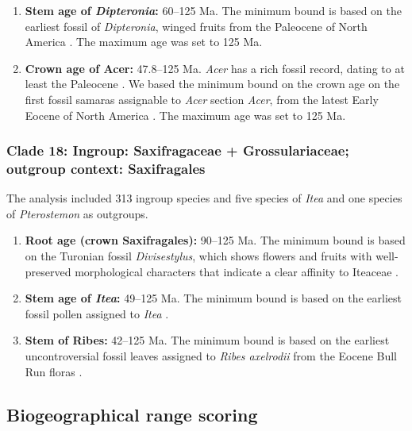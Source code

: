 \documentclass[10pt]{article}
\newcommand{\fntodo}[2][]
{\todo[caption={#2}, size=\footnotesize, #1]
{\begin{spacing}{0.5}#2\end{spacing}}}
\begin{document}
\begin{enumerate}

\item \textbf{Stem age of \textit{Dipteronia}:} 60--125 Ma. The
  minimum bound is based on the earliest fossil of
  \textit{Dipteronia}, winged fruits from the Paleocene of North
  America \citep{McClain2001}. {\color{red}The maximum age was set to
    125 Ma}\fntodo{why?}.

\item \textbf{Crown age of Acer:} 47.8--125 Ma. \textit{Acer} has a
  rich fossil record, dating to at least the Paleocene
  \citep{Wolfe1987,Mai1995}. We based the minimum bound on the crown
  age on the first fossil samaras assignable to \textit{Acer} section
  \textit{Acer}, from the latest Early Eocene of North America
  \citep{Wolfe1987}. {\color{red}The maximum age was set to 125 Ma}.

\end{enumerate}

\subsubsection*{Clade 18: Ingroup: Saxifragaceae + Grossulariaceae;
  outgroup context: Saxifragales}

The analysis included 313 ingroup species and five species of
\textit{Itea} and one species of \textit{Pterostemon} as outgroups.

\begin{enumerate}
\item \textbf{Root age (crown Saxifragales):} 90--125 Ma. The minimum
  bound is based on the Turonian fossil \textit{Divisestylus}, which
  shows flowers and fruits with well-preserved morphological
  characters that indicate a clear affinity to Iteaceae
  \citep{Hermsen2003}.

\item \textbf{Stem age of \textit{Itea}:} 49--125 Ma. The minimum
  bound is based on the earliest fossil pollen assigned to \emph{Itea}
  \citep{Hermsen2013}.

\item \textbf{Stem of Ribes:} 42--125 Ma. The minimum bound is based
  on the earliest uncontroversial fossil leaves assigned to
  \textit{Ribes axelrodii} from the Eocene Bull Run floras \citep{Hermsen2005}.
\end{enumerate}

\subsection*{Biogeographical range scoring}
\end{document}
